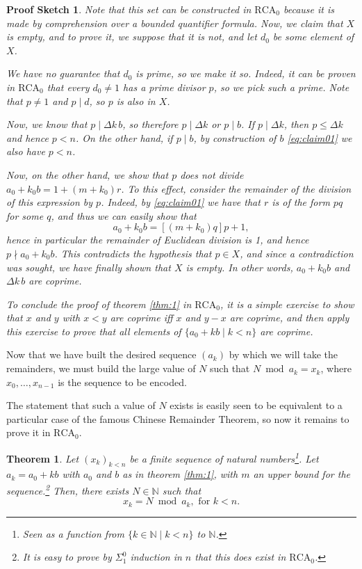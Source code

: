 \documentclass{article}
\newtheorem{theorem}{Theorem}
\theoremstyle{nonumberplain}
\newtheorem{sketch}{Proof Sketch}
\newcommand{\N}{\mathbb{N}}
\newcommand{\RCA}{\mathrm{RCA}}
\begin{document}
\begin{sketch}
Note that this set can be constructed in $\RCA_0$ because it is made by comprehension over a bounded quantifier formula. Now, we claim that $X$ is empty, and to prove it, we suppose that it is not, and let $d_0$ be some element of $X$.

We have no guarantee that $d_0$ is prime, so we make it so. Indeed, it can be proven in $\RCA_0$ that every $d_0 \neq 1$ has a prime divisor $p$, so we pick such a prime. Note that $p \neq 1$ and $p \mid d$, so $p$ is also in $X$.

Now, we know that $p \mid \Delta k \, b$, so therefore $p \mid \Delta k$ or $p \mid b$. If $p \mid \Delta k$, then $p \leq \Delta k$ and hence $p < n$. On the other hand, if $p \mid b$, by construction of $b$ \eqref{eq:claim01} we also have $p < n$.

Now, on the other hand, we show that $p$ does not divide $a_0 + k_0 b = 1 + (m + k_0) r$. To this effect, consider the remainder of the division of this expression by $p$. Indeed, by \eqref{eq:claim01} we have that $r$ is of the form $p q$ for some $q$, and thus we can easily show that
\begin{equation}
a_0 + k_0 b = [(m + k_0) q] p + 1,
\end{equation}
hence in particular the remainder of Euclidean division is 1, and hence $p \nmid a_0 + k_0 b$. This contradicts the hypothesis that $p \in X$, and since a contradiction was sought, we have finally shown that $X$ is empty. In other words, $a_0 + k_0 b$ and $\Delta k \, b$ are coprime.

To conclude the proof of theorem \ref{thm:1} in $\RCA_0$, it is a simple exercise to show that $x$ and $y$ with $x<y$ are coprime iff $x$ and $y-x$ are coprime, and then apply this exercise to prove that all elements of $\{a_0 + k b \mid k < n\}$ are coprime.
\end{sketch}

Now that we have built the desired sequence $(a_k)$ by which we will take the remainders, we must build the large value of $N$ such that $N \bmod a_k = x_k$, where $x_0, \dots, x_{n-1}$ is the sequence to be encoded.

The statement that such a value of $N$ exists is easily seen to be equivalent to a particular case of the famous Chinese Remainder Theorem, so now it remains to prove it in $\RCA_0$.

\begin{theorem}\label{thm:2}
Let $(x_k)_{k < n}$ be a finite sequence of natural numbers\footnote{Seen as a function from $\{k \in \N \mid k<n\}$ to $\N$.}. Let $a_k = a_0 + k b$ with $a_0$ and $b$ as in theorem \ref{thm:1}, with $m$ an upper bound for the sequence.\footnote{It is easy to prove by $\Sigma^0_1$ induction in $n$ that this does exist in $\RCA_0$.} Then, there exists $N \in \N$ such that
\begin{equation}\label{eq:encodes}
x_k = N \bmod a_k, \text{ for $k < n$.}
\end{equation}
\end{theorem}
\end{document}
